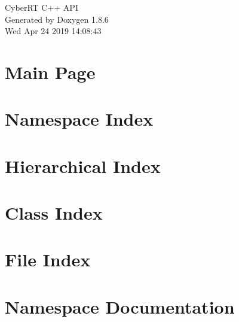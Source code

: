 \documentclass[twoside]{book}
\newcommand{\clearemptydoublepage}{%
  \newpage{\pagestyle{empty}\cleardoublepage}%
}
\begin{document}
\hypersetup{pageanchor=false}
\begin{titlepage}
\vspace*{7cm}
\begin{center}%
{\Large Cyber\-R\-T C++ A\-P\-I }\\
\vspace*{1cm}
{\large Generated by Doxygen 1.8.6}\\
\vspace*{0.5cm}
{\small Wed Apr 24 2019 14:08:43}\\
\end{center}
\end{titlepage}
\clearemptydoublepage
\tableofcontents
\clearemptydoublepage
{}
\hypersetup{pageanchor=true}

\chapter{Main Page}
\label{index}\hypertarget{index}{}
\chapter{Namespace Index}

\chapter{Hierarchical Index}

\chapter{Class Index}

\chapter{File Index}

\chapter{Namespace Documentation}






























\end{document}
